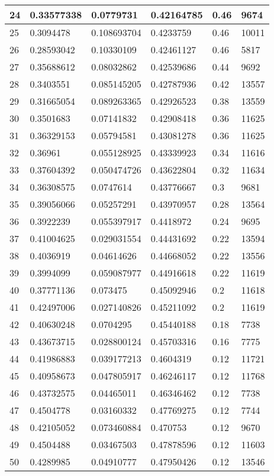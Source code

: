 \begin{longtable}{|l|l|l|l|l|l|}
24 & 0.33577338 & 0.0779731 & 0.42164785 & 0.46 & 9674 \\ \hline 
25 & 0.3094478 & 0.108693704 & 0.4233759 & 0.46 & 10011 \\ \hline 
26 & 0.28593042 & 0.10330109 & 0.42461127 & 0.46 & 5817 \\ \hline 
27 & 0.35688612 & 0.08032862 & 0.42539686 & 0.44 & 9692 \\ \hline 
28 & 0.3403551 & 0.085145205 & 0.42787936 & 0.42 & 13557 \\ \hline 
29 & 0.31665054 & 0.089263365 & 0.42926523 & 0.38 & 13559 \\ \hline 
30 & 0.3501683 & 0.07141832 & 0.42908418 & 0.36 & 11625 \\ \hline 
31 & 0.36329153 & 0.05794581 & 0.43081278 & 0.36 & 11625 \\ \hline 
32 & 0.36961 & 0.055128925 & 0.43339923 & 0.34 & 11616 \\ \hline 
33 & 0.37604392 & 0.050474726 & 0.43622804 & 0.32 & 11634 \\ \hline 
34 & 0.36308575 & 0.0747614 & 0.43776667 & 0.3 & 9681 \\ \hline 
35 & 0.39056066 & 0.05257291 & 0.43970957 & 0.28 & 13564 \\ \hline 
36 & 0.3922239 & 0.055397917 & 0.4418972 & 0.24 & 9695 \\ \hline 
37 & 0.41004625 & 0.029031554 & 0.44431692 & 0.22 & 13594 \\ \hline 
38 & 0.4036919 & 0.04614626 & 0.44668052 & 0.22 & 13556 \\ \hline 
39 & 0.3994099 & 0.059087977 & 0.44916618 & 0.22 & 11619 \\ \hline 
40 & 0.37771136 & 0.073475 & 0.45092946 & 0.2 & 11618 \\ \hline 
41 & 0.42497006 & 0.027140826 & 0.45211092 & 0.2 & 11619 \\ \hline 
42 & 0.40630248 & 0.0704295 & 0.45440188 & 0.18 & 7738 \\ \hline 
43 & 0.43673715 & 0.028800124 & 0.45703316 & 0.16 & 7775 \\ \hline 
44 & 0.41986883 & 0.039177213 & 0.4604319 & 0.12 & 11721 \\ \hline 
45 & 0.40958673 & 0.047805917 & 0.46246117 & 0.12 & 11768 \\ \hline 
46 & 0.43732575 & 0.04465011 & 0.46346462 & 0.12 & 7738 \\ \hline 
47 & 0.4504778 & 0.03160332 & 0.47769275 & 0.12 & 7744 \\ \hline 
48 & 0.42105052 & 0.073460884 & 0.470753 & 0.12 & 9670 \\ \hline 
49 & 0.4504488 & 0.03467503 & 0.47878596 & 0.12 & 11603 \\ \hline 
50 & 0.4289985 & 0.04910777 & 0.47950426 & 0.12 & 13546 \\ \hline 
\end{longtable}